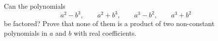 Can the polynomials
\[
a^2-b^3,\qquad a^2+b^3,\qquad a^3-b^2,\qquad a^3+b^2
\]
be factored? Prove that none of them is a product of two non-constant polynomials in $a$ and $b$ with real coefficients.
